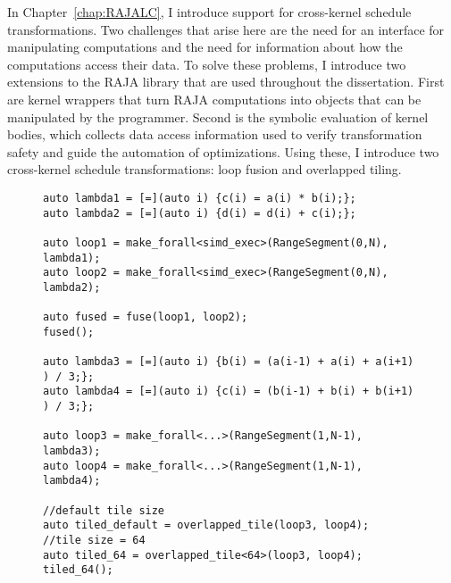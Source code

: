 In Chapter~\ref{chap:RAJALC}, I introduce support for cross-kernel schedule transformations.
Two challenges that arise here are the need for an interface for manipulating computations and the need for information about how the computations access their data.
To solve these problems, I introduce two extensions to the RAJA library that are used throughout the dissertation.
First are kernel wrappers that turn RAJA computations into objects that can be manipulated by the programmer.
Second is the symbolic evaluation of kernel bodies, which collects data access information used to verify transformation safety and guide the automation of optimizations.
Using these, I introduce two cross-kernel schedule transformations: loop fusion and overlapped tiling.
\begin{figure}[t]
\begin{lstlisting}[caption={Using the \texttt{fuse} and \texttt{overlapped\_tile} transformations.}, label={Intro:transformExample}]
auto lambda1 = [=](auto i) {c(i) = a(i) * b(i);};
auto lambda2 = [=](auto i) {d(i) = d(i) + c(i);};

auto loop1 = make_forall<simd_exec>(RangeSegment(0,N), lambda1);
auto loop2 = make_forall<simd_exec>(RangeSegment(0,N), lambda2);

auto fused = fuse(loop1, loop2);
fused();

auto lambda3 = [=](auto i) {b(i) = (a(i-1) + a(i) + a(i+1) ) / 3;};
auto lambda4 = [=](auto i) {c(i) = (b(i-1) + b(i) + b(i+1) ) / 3;};

auto loop3 = make_forall<...>(RangeSegment(1,N-1), lambda3);
auto loop4 = make_forall<...>(RangeSegment(1,N-1), lambda4);

//default tile size
auto tiled_default = overlapped_tile(loop3, loop4);
//tile size = 64
auto tiled_64 = overlapped_tile<64>(loop3, loop4);
tiled_64();
\end{lstlisting}
\end{figure}

